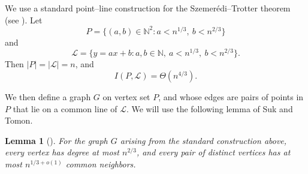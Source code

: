 \documentclass[11pt]{article}
\theoremstyle{plain}
\newtheorem{lemma}[theorem]{Lemma}
\theoremstyle{definition}
\theoremstyle{remark}
\begin{document}
We use a standard point--line construction for the Szemerédi--Trotter theorem (see \cite{SuT}).  Let
\[
P=\{(a,b)\in \mathbb{N}^2: a<n^{1/3},\ b<n^{2/3}\}
\]
and
\[
\mathcal L=\{y=ax+b: a,b\in \mathbb{N},\ a<n^{1/3},\ b<n^{2/3}\}.
\]
Then \(|P|=|\mathcal L|=n\), and
\[
I(P,\mathcal L)=\Theta(n^{4/3}).
\]

We then define a graph \(G\) on vertex set \(P\), and whose edges are pairs of points in $P$ that lie on a common line of \(\mathcal L\).  We will use the following lemma of Suk and Tomon.

\begin{lemma}[{\cite[Claim 16]{SuT}}]
For the graph \(G\) arising from the standard construction above, every vertex has degree at most $n^{2/3}$, and every pair of distinct vertices has at most $n^{1/3+o(1)}$ common neighbors.
\end{lemma}
\end{document}
